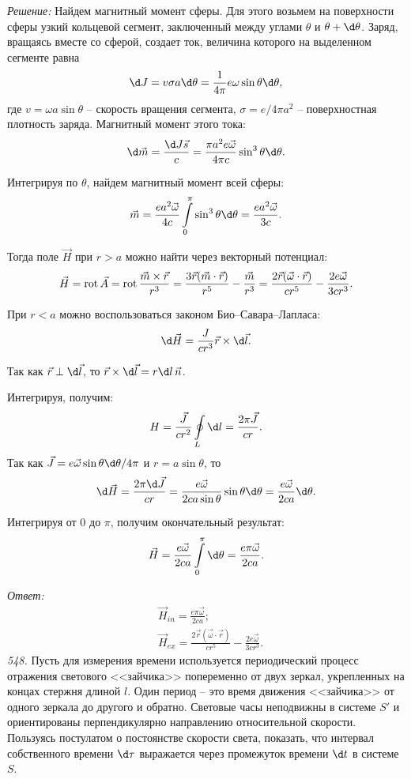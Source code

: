 \vspace*{2em}
\emph{Решение:}
Найдем магнитный момент сферы. Для этого возьмем на поверхности сферы узкий
кольцевой сегмент, заключенный между углами \( \theta \) и \( \theta + \d\theta \).
Заряд, вращаясь вместе со сферой, создает ток, величина которого на выделенном
сегменте равна
\[
    \d J = v\sigma a\d\theta = \frac{1}{4\pi}e\omega\sin\theta\d\theta,
\]
где \( v = \omega a\sin\theta \) -- скорость вращения сегмента, \( \sigma =
e/4\pi a^2 \) -- поверхностная плотность заряда. Магнитный момент этого тока:
\[
    \d\vec{m} = \frac{\d J\vec{s}}{c} = \frac{\pi a^2e\vec{\omega}}{4\pi c}
    \sin^3\theta\d\theta.
\]

Интегрируя по \( \theta \), найдем магнитный момент всей сферы:
\[
    \vec{m} =  \frac{ea^2\vec{\omega}}{4c}\int\limits_0^\pi \sin^3\theta\d\theta
    = \frac{ea^2\vec{\omega}}{3c}.
\]

Тогда поле \( \vec{H} \) при \( r > a \) можно найти через векторный потенциал:
\[
    \vec{H} = \mathrm{rot\,}\vec{A} = \mathrm{rot\,}\frac{\vec{m}\times\vec{r}}{r^3} =
    \frac{3\vec{r}(\vec{m}\cdot\vec{r})}{r^5} - \frac{\vec{m}}{r^3} =
    \frac{2\vec{r}(\vec{\omega}\cdot\vec{r})}{cr^5} - \frac{2e\vec{\omega}}{3cr^3}.
\]

При \( r < a \) можно воспользоваться законом Био--Савара--Лапласа:
\[
    \d\vec{H} = \frac{J}{cr^3}\vec{r}\times\d\vec{l}.
\]

Так как \( \vec{r} \perp \d\vec{l} \), то \( \vec{r}\times\d\vec{l} = r\d l\,\vec{n} \).

Интегрируя, получим:
\[
    H = \frac{\vec{J}}{cr^2}\oint\limits_L \d l = \frac{2\pi\vec{J}}{cr}.
\]
Так как \( \vec{J} = e\vec{\omega}\sin\theta\d\theta/4\pi \) и \( r = a\sin\theta \), то
\[
    \d\vec{H} = \frac{2\pi\d\vec{J}}{cr} = \frac{e\vec{\omega}}{2ca\sin\theta}
    \sin\theta\d\theta = \frac{e\vec{\omega}}{2ca}\d\theta.
\]

Интегрируя от \( 0 \) до \( \pi \), получим окончательный результат:
\[
    \vec{H} = \frac{e\vec{\omega}}{2ca}\int\limits_0^\pi \d\theta =
    \frac{e\pi\vec{\omega}}{2ca}.
\]

\vspace*{2em}
\emph{Ответ:}
\begin{align*}
    & \vec{H}_{in} = \frac{e\pi\vec{\omega}}{2ca}; \\
    & \vec{H}_{ex} = \frac{2\vec{r}(\vec{\omega}\cdot\vec{r})}{cr^5} -
    \frac{2e\vec{\omega}}{3cr^3}.
\end{align*}
\newpage
\emph{548.} Пусть для измерения времени используется периодический процесс
отражения светового <<зайчика>> попеременно от двух зеркал, укрепленных на
концах стержня длиной \( l \). Один период -- это время движения <<зайчика>> от
одного зеркала до другого и обратно. Световые часы неподвижны в системе \( S' \)
и ориентированы перпендикулярно направлению относительной скорости.
Пользуясь постулатом о постоянстве скорости света, показать, что интервал
собственного времени \( \d\tau \) выражается через промежуток времени \( \d t \)
в системе \( S \).

